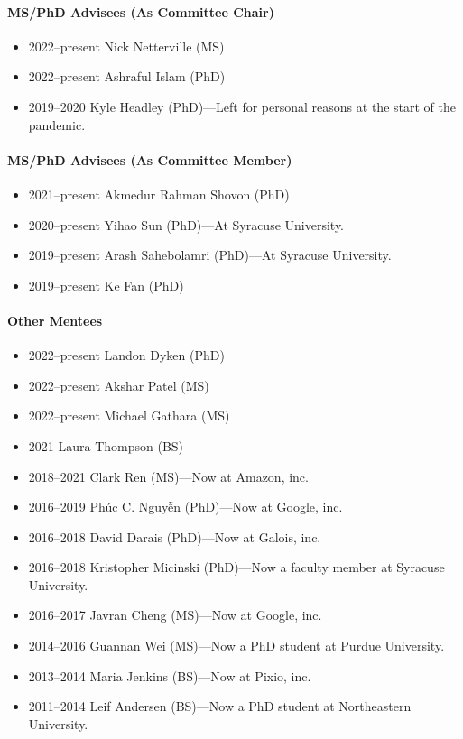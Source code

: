 \paragraph{MS/PhD Advisees (As Committee Chair)}
\begin{itemize}
\vspace{0.15cm}\item 2022--present Nick Netterville (MS)
\item 2022--present Ashraful Islam (PhD)
\item 2019--2020 Kyle Headley (PhD)---Left for personal reasons at the start of the pandemic.
\end{itemize}
\paragraph{MS/PhD Advisees (As Committee Member)}
\begin{itemize}
\vspace{0.15cm}\item 2021--present Akmedur Rahman Shovon (PhD)
\item 2020--present Yihao Sun (PhD)---At Syracuse University.
\item 2019--present Arash Sahebolamri (PhD)---At Syracuse University.
\item 2019--present Ke Fan (PhD)
\end{itemize}
\paragraph{Other Mentees}
\begin{itemize}
\vspace{0.15cm}\item 2022--present Landon Dyken (PhD)
\item 2022--present Akshar Patel (MS)
\item 2022--present Michael Gathara (MS)
\item 2021 Laura Thompson (BS)
\item 2018--2021 Clark Ren (MS)---Now at Amazon, inc.
\item 2016--2019 Phúc C. Nguyễn (PhD)---Now at Google, inc.
\item 2016--2018 David Darais (PhD)---Now at Galois, inc.
\item 2016--2018 Kristopher Micinski (PhD)---Now a faculty member at Syracuse University.
\item 2016--2017 Javran Cheng (MS)---Now at Google, inc.
\item 2014--2016 Guannan Wei (MS)---Now a PhD student at Purdue University.
\item 2013--2014 Maria Jenkins (BS)---Now at Pixio, inc.
\item 2011--2014 Leif Andersen (BS)---Now a PhD student at Northeastern University.
\end{itemize}

